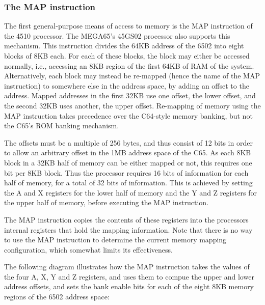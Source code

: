 \subsubsection{The MAP instruction}
\label{sec:map-instruction}

The first general-purpose means of access to memory is the MAP instruction of the
4510 processor. The MEGA65's 45GS02 processor also supports this mechanism.
This instruction divides the 64KB address of the 6502 into eight blocks of 8KB each.
For each of these blocks, the block may either be accessed normally, i.e., accessing
an 8KB region of the first 64KB of RAM of the system.  Alternatively, each block
may instead be re-mapped (hence the name of the MAP instruction) to somewhere else
in the address space, by adding an offset to the address. Mapped addresses in the
first 32KB use one offset, the lower offset, and the second 32KB uses another, the
upper offset.  Re-mapping of memory using the MAP instruction takes precedence over
the C64-style memory banking, but not the C65's ROM banking mechanism.

The offsets must be a multiple of 256 bytes, and thus consist of 12 bits
in order to allow an arbitrary offset in the 1MB address space of the C65.  As each 8KB
block in a 32KB half of memory can be either mapped or not, this requires one bit per
8KB block.  Thus the processor requires 16 bits of information for each half of memory, for
a total of 32 bits of information.  This is achieved by setting the A and X registers for
the lower half of memory and the Y and Z registers for the upper half of memory, before executing
the MAP instruction.

The MAP instruction copies the contents of these registers into the
processors internal registers that hold the mapping information.  Note that there is no way to
use the MAP instruction to determine the current memory mapping configuration, which somewhat
limits its effectiveness.

The following diagram illustrates how the MAP instruction takes the values of the four A, X, Y and Z
registers, and uses them to compue the upper and lower address offsets, and sets the bank enable bits
for each of the eight 8KB memory regions of the 6502 address space:

